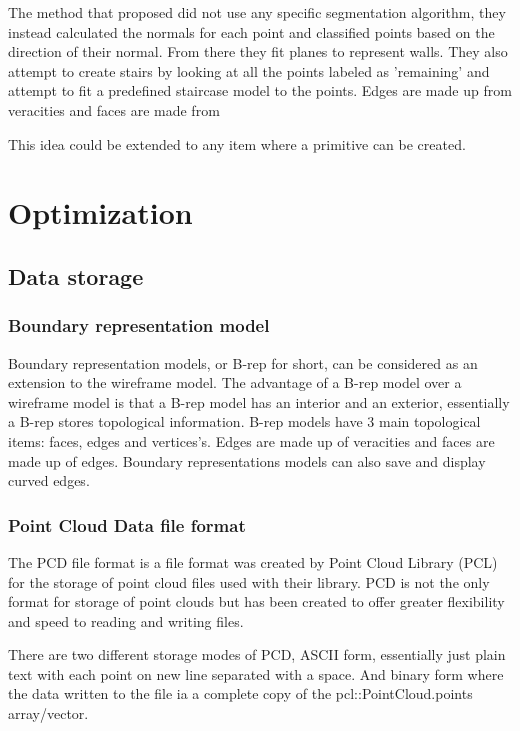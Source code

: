 			The method that \citeauthor{sanchez_planar_2012} proposed did not use any specific segmentation algorithm, they instead calculated the normals for each point and classified points based on the direction of their normal. From there they fit planes to represent walls. They also attempt to create stairs by looking at all the points labeled as 'remaining' and attempt to fit a predefined staircase model to the points. Edges are made up from veracities and faces are made from 
				
			This idea could be extended to any item where a primitive can be created. 


	
\section{Optimization}
	\subsection{Data storage}
	
		\subsubsection{Boundary representation model}
			Boundary representation models, or B-rep for short, can be considered as an extension to the wireframe model. The advantage of a B-rep model over a wireframe model is that a B-rep model has an interior and an exterior, essentially a B-rep stores topological information. B-rep models have 3 main topological items: faces, edges and vertices's. Edges are made up of veracities and faces are made up of edges. Boundary representations models can also save and display curved edges. 
			
	
		\subsubsection{Point Cloud Data file format}
			The PCD file format is a file format was created by Point Cloud Library (PCL) for the storage of point cloud files used with their library. PCD is not the only format for storage of point clouds but has been created to offer greater flexibility and speed to reading and writing files.
			
			There are two different storage modes of PCD, ASCII form, essentially just plain text with each point on new line separated with a space. And binary form where the data written to the file ia a complete copy of the pcl::PointCloud.points array/vector.
			
